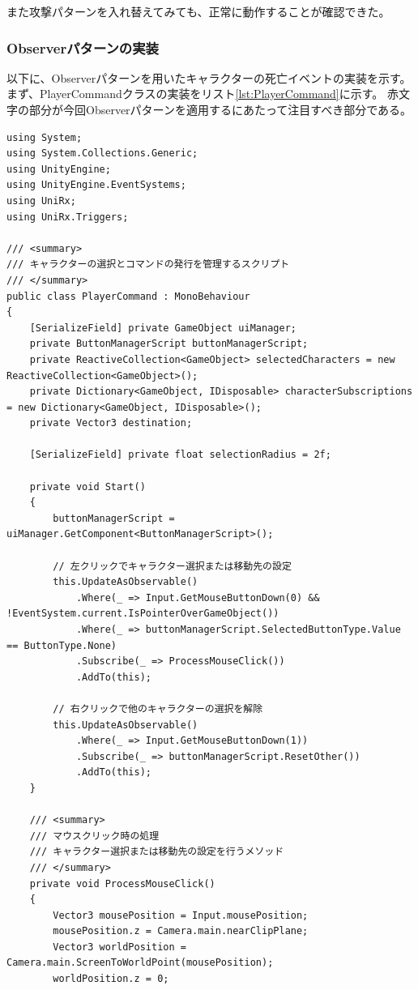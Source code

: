 \documentclass[dvipdfmx,fleqn,article]{jlreq}
\begin{document}
また攻撃パターンを入れ替えてみても、正常に動作することが確認できた。



\subsubsection{Observerパターンの実装}
以下に、Observerパターンを用いたキャラクターの死亡イベントの実装を示す。
まず、PlayerCommandクラスの実装をリスト\ref{lst:PlayerCommand}に示す。
赤文字の部分が今回Observerパターンを適用するにあたって注目すべき部分である。
\begin{lstlisting}[language=CSharp, caption=PlayerCommandクラス, label={lst:PlayerCommand}]
using System;
using System.Collections.Generic;
using UnityEngine;
using UnityEngine.EventSystems;
using UniRx;
using UniRx.Triggers;

/// <summary>
/// キャラクターの選択とコマンドの発行を管理するスクリプト
/// </summary>
public class PlayerCommand : MonoBehaviour
{
    [SerializeField] private GameObject uiManager;
    private ButtonManagerScript buttonManagerScript;
    private ReactiveCollection<GameObject> selectedCharacters = new ReactiveCollection<GameObject>();
    private Dictionary<GameObject, IDisposable> characterSubscriptions = new Dictionary<GameObject, IDisposable>();
    private Vector3 destination;

    [SerializeField] private float selectionRadius = 2f;

    private void Start()
    {
        buttonManagerScript = uiManager.GetComponent<ButtonManagerScript>();

        // 左クリックでキャラクター選択または移動先の設定
        this.UpdateAsObservable()
            .Where(_ => Input.GetMouseButtonDown(0) && !EventSystem.current.IsPointerOverGameObject())
            .Where(_ => buttonManagerScript.SelectedButtonType.Value == ButtonType.None)
            .Subscribe(_ => ProcessMouseClick())
            .AddTo(this);

        // 右クリックで他のキャラクターの選択を解除
        this.UpdateAsObservable()
            .Where(_ => Input.GetMouseButtonDown(1))
            .Subscribe(_ => buttonManagerScript.ResetOther())
            .AddTo(this);
    }

    /// <summary>
    /// マウスクリック時の処理
    /// キャラクター選択または移動先の設定を行うメソッド
    /// </summary>
    private void ProcessMouseClick()
    {
        Vector3 mousePosition = Input.mousePosition;
        mousePosition.z = Camera.main.nearClipPlane;
        Vector3 worldPosition = Camera.main.ScreenToWorldPoint(mousePosition);
        worldPosition.z = 0;


\end{lstlisting}
\end{document}
